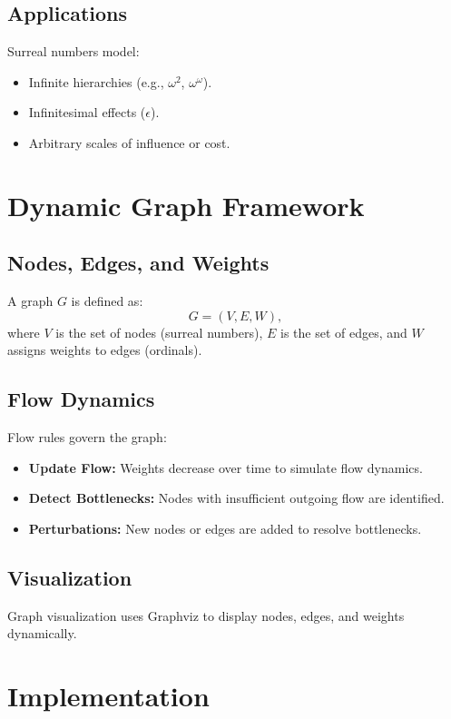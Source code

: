 \documentclass[12pt]{article}
\begin{document}
\subsection{Applications}
Surreal numbers model:
\begin{itemize}
    \item Infinite hierarchies (e.g., \( \omega^2 \), \( \omega^\omega \)).
    \item Infinitesimal effects (\( \epsilon \)).
    \item Arbitrary scales of influence or cost.
\end{itemize}

\section{Dynamic Graph Framework}

\subsection{Nodes, Edges, and Weights}
A graph \( G \) is defined as:
\begin{equation}
G = (V, E, W),
\end{equation}
where \( V \) is the set of nodes (surreal numbers), \( E \) is the set of edges, and \( W \) assigns weights to edges (ordinals).

\subsection{Flow Dynamics}
Flow rules govern the graph:
\begin{itemize}
    \item \textbf{Update Flow:} Weights decrease over time to simulate flow dynamics.
    \item \textbf{Detect Bottlenecks:} Nodes with insufficient outgoing flow are identified.
    \item \textbf{Perturbations:} New nodes or edges are added to resolve bottlenecks.
\end{itemize}

\subsection{Visualization}
Graph visualization uses Graphviz to display nodes, edges, and weights dynamically.

\section{Implementation}
\end{document}
